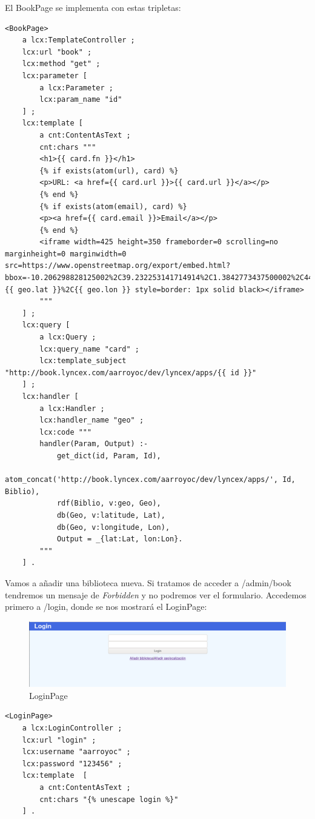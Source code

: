 \documentclass[12pt]{report} %
\begin{document}
El BookPage se implementa con estas tripletas:
\begin{lstlisting}
<BookPage>
    a lcx:TemplateController ;
    lcx:url "book" ;
    lcx:method "get" ;
    lcx:parameter [
        a lcx:Parameter ;
        lcx:param_name "id"
    ] ;
    lcx:template [
        a cnt:ContentAsText ;
        cnt:chars """
        <h1>{{ card.fn }}</h1>
        {% if exists(atom(url), card) %}
        <p>URL: <a href={{ card.url }}>{{ card.url }}</a></p>
        {% end %}
        {% if exists(atom(email), card) %}
        <p><a href={{ card.email }}>Email</a></p>
        {% end %}
        <iframe width=425 height=350 frameborder=0 scrolling=no marginheight=0 marginwidth=0 src=https://www.openstreetmap.org/export/embed.html?bbox=-10.206298828125002%2C39.232253141714914%2C1.3842773437500002%2C44.33956524809713&marker={{ geo.lat }}%2C{{ geo.lon }} style=border: 1px solid black></iframe>
        """
    ] ;
    lcx:query [
        a lcx:Query ;
        lcx:query_name "card" ;
        lcx:template_subject "http://book.lyncex.com/aarroyoc/dev/lyncex/apps/{{ id }}"
    ] ;
    lcx:handler [
        a lcx:Handler ;
        lcx:handler_name "geo" ;
        lcx:code """
        handler(Param, Output) :-
            get_dict(id, Param, Id),
            atom_concat('http://book.lyncex.com/aarroyoc/dev/lyncex/apps/', Id, Biblio),
            rdf(Biblio, v:geo, Geo),
            db(Geo, v:latitude, Lat),
            db(Geo, v:longitude, Lon),
            Output = _{lat:Lat, lon:Lon}.
        """
    ] .
\end{lstlisting}

Vamos a añadir una biblioteca nueva. Si tratamos de acceder a /admin/book tendremos un mensaje de \textit{Forbidden} y no podremos ver el formulario. Accedemos primero a /login, donde se nos mostrará el LoginPage:

\begin{figure}
    \centering
    \includegraphics{tour/bibliocyl4.png}
    \caption{LoginPage}
    \label{fig:bibliocyl4}
\end{figure}

\begin{lstlisting}
<LoginPage>
    a lcx:LoginController ;
    lcx:url "login" ;
    lcx:username "aarroyoc" ;
    lcx:password "123456" ;
    lcx:template  [
        a cnt:ContentAsText ;
        cnt:chars "{% unescape login %}"
    ] .
\end{lstlisting}
\end{document}
